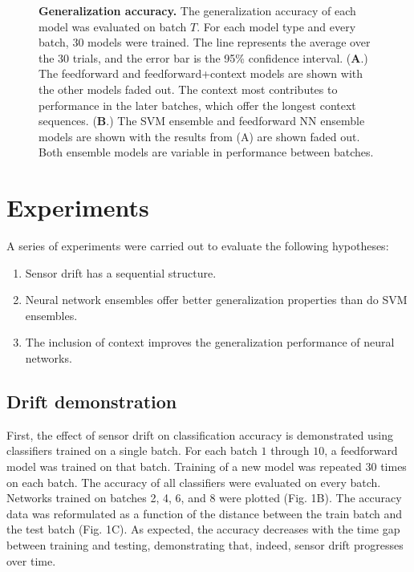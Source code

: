 \documentclass[onecolumn,pre,floats,aps,amsmath,amssymb,superscriptaddress]{revtex4-1}
\begin{document}
\begin{figure}
	\caption{\textbf{Generalization accuracy.} The generalization accuracy of each model was evaluated on batch $T$. For each model type and every batch, 30 models were trained. The line represents the average over the 30 trials, and the error bar is the 95\% confidence interval. (\textbf{A}.) The feedforward and feedforward+context models are shown with the other models faded out. The context most contributes to performance in the later batches, which offer the longest context sequences. (\textbf{B}.) The SVM ensemble and feedforward NN ensemble models are shown with the results from (A) are shown faded out. Both ensemble models are variable in performance between batches. }
\end{figure}

\section{Experiments}
A series of experiments were carried out to evaluate the following hypotheses:
\begin{enumerate}
\item Sensor drift has a sequential structure.
\item Neural network ensembles offer better generalization properties than do SVM ensembles.
\item The inclusion of context improves the generalization performance of neural networks.
\end{enumerate}

\subsection{Drift demonstration}
First, the effect of sensor drift on classification accuracy is demonstrated using classifiers trained on a single batch. For each batch $1$ through $10$, a feedforward model was trained on that batch. Training of a new model was repeated 30 times on each batch. The accuracy of all classifiers were evaluated on every batch. Networks trained on batches 2, 4, 6, and 8 were plotted (Fig. 1B).  The accuracy data was reformulated as a function of the distance between the train batch and the test batch (Fig. 1C). As expected, the accuracy decreases with the time gap between training and testing, demonstrating that, indeed, sensor drift progresses over time.
\end{document}
